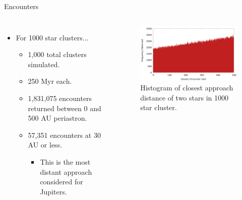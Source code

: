\documentclass{beamer}
\begin{document}
\begin{frame}{Encounters}
    \begin{columns}
            \begin{itemize}
                \item For 1000 star clusters...
                    \begin{itemize}
                        \item 1,000 total clusters simulated.
                        \item 250 Myr each.
                        \item 1,831,075 encounters returned between 0 and 500 AU periastron.
                        \item 57,351 encounters at 30 AU or less.
                            \begin{itemize}
                                \item This is the most distant approach considered for Jupiters.
                            \end{itemize}
                    \end{itemize}
            \end{itemize}
            \begin{figure}
                \centering
                \caption{Histogram of closest approach distance of two stars in 1000 star cluster.}
                \includegraphics[width=2.25in]{encounter_distance_frequency_n1000}
            \end{figure}
    \end{columns}
\end{frame}
\end{document}
